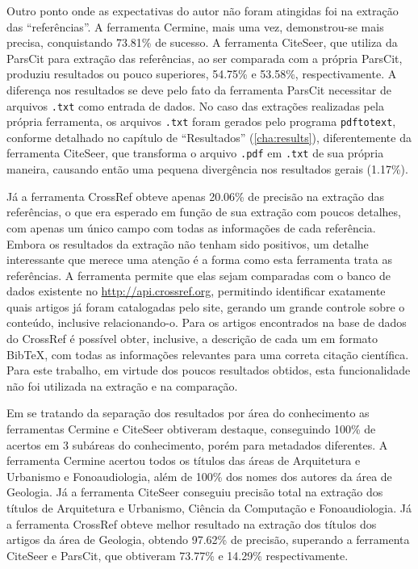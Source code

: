 Outro ponto onde as expectativas do autor não foram atingidas foi na extração das ``referências''. A ferramenta Cermine, mais uma vez, demonstrou-se mais precisa, conquistando 73.81\% de sucesso. A ferramenta CiteSeer, que utiliza da ParsCit para extração das referências, ao ser comparada com a própria ParsCit, produziu resultados ou pouco superiores, 54.75\% e 53.58\%, respectivamente. A diferença nos resultados se deve pelo fato da ferramenta ParsCit necessitar de arquivos \texttt{.txt} como entrada de dados. No caso das extrações realizadas pela própria ferramenta, os arquivos \texttt{.txt} foram gerados pelo programa \texttt{pdftotext}, conforme detalhado no capítulo de ``Resultados'' (\autoref{cha:results}), diferentemente da ferramenta CiteSeer, que transforma o arquivo \texttt{.pdf} em \texttt{.txt} de sua própria maneira, causando então uma pequena divergência nos resultados gerais (1.17\%). 

Já a ferramenta CrossRef obteve apenas 20.06\% de precisão na extração das referências, o que era esperado em função de sua extração com poucos detalhes, com apenas um único campo com todas as informações de cada referência. Embora os resultados da extração não tenham sido positivos, um detalhe interessante que merece uma atenção é a forma como esta ferramenta trata as referências. A ferramenta permite que elas sejam comparadas com o banco de dados existente no \url{http://api.crossref.org}, permitindo identificar exatamente quais artigos já foram catalogadas pelo site, gerando um grande controle sobre o conteúdo, inclusive relacionando-o. Para os artigos encontrados na base de dados do CrossRef é possível obter, inclusive, a descrição de cada um em formato BibTeX, com todas as informações relevantes para uma correta citação científica. Para este trabalho, em virtude dos poucos resultados obtidos, esta funcionalidade não foi utilizada na extração e na comparação.

Em se tratando da separação dos resultados por área do conhecimento as ferramentas Cermine e CiteSeer obtiveram destaque, conseguindo 100\% de acertos em 3 subáreas do conhecimento, porém para metadados diferentes. A ferramenta Cermine acertou todos os títulos das áreas de Arquitetura e Urbanismo e Fonoaudiologia, além de 100\% dos nomes dos autores da área de Geologia. Já a ferramenta CiteSeer conseguiu precisão total na extração dos títulos de Arquitetura e Urbanismo, Ciência da Computação e Fonoaudiologia. Já a ferramenta CrossRef obteve melhor resultado na extração dos títulos dos artigos da área de Geologia, obtendo 97.62\% de precisão, superando a ferramenta CiteSeer e ParsCit, que obtiveram 73.77\% e 14.29\% respectivamente.

